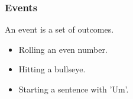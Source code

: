\documentclass[12pt, block=fill]{beamer}
\begin{document}
\begin{frame}
  \frametitle{Events}
  An event is a set of outcomes.
  
  \begin{itemize}
  \item Rolling an even number. 
  \item Hitting a bullseye. 
  \item Starting a sentence with 'Um'.
   
  \end{itemize}
\end{frame}
\end{document}
